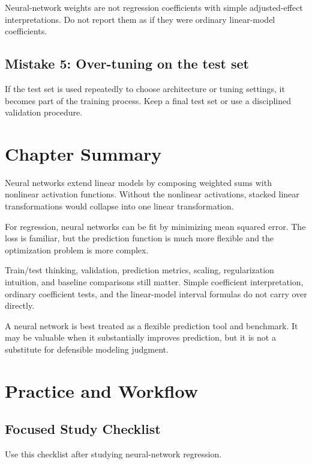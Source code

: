 Neural-network weights are not regression coefficients with simple adjusted-effect interpretations.  Do not report them as if they were ordinary linear-model coefficients.

\subsection*{Mistake 5: Over-tuning on the test set}

If the test set is used repeatedly to choose architecture or tuning settings, it becomes part of the training process.  Keep a final test set or use a disciplined validation procedure.

\section{Chapter Summary}

Neural networks extend linear models by composing weighted sums with nonlinear activation functions.  Without the nonlinear activations, stacked linear transformations would collapse into one linear transformation.

For regression, neural networks can be fit by minimizing mean squared error.  The loss is familiar, but the prediction function is much more flexible and the optimization problem is more complex.

Train/test thinking, validation, prediction metrics, scaling, regularization intuition, and baseline comparisons still matter.  Simple coefficient interpretation, ordinary coefficient tests, and the linear-model interval formulas do not carry over directly.

A neural network is best treated as a flexible prediction tool and benchmark.  It may be valuable when it substantially improves prediction, but it is not a substitute for defensible modeling judgment.

\section{Practice and Workflow}

\subsection*{Focused Study Checklist}

Use this checklist after studying neural-network regression.


